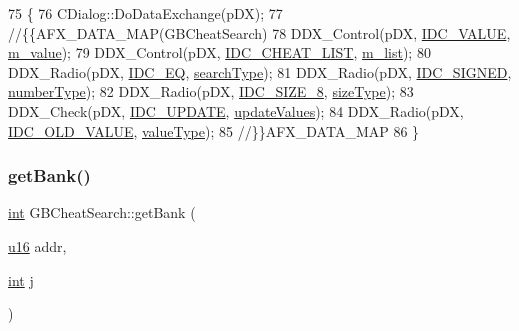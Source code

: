 \begin{DoxyCode}
75 \{
76   CDialog::DoDataExchange(pDX);
77   \textcolor{comment}{//\{\{AFX\_DATA\_MAP(GBCheatSearch)}
78   DDX\_Control(pDX, \mbox{\hyperlink{resource_8h_aa862eefddc803e8e65c3253b8029314f}{IDC\_VALUE}}, \mbox{\hyperlink{class_g_b_cheat_search_a95286f2e1e0637f2879a2dbe729d34c1}{m\_value}});
79   DDX\_Control(pDX, \mbox{\hyperlink{resource_8h_a9e21f8b69374571cc4aa6ab5a8ce0b9b}{IDC\_CHEAT\_LIST}}, \mbox{\hyperlink{class_g_b_cheat_search_a4385c178810aafb751e2bbc80a1a67c3}{m\_list}});
80   DDX\_Radio(pDX, \mbox{\hyperlink{resource_8h_a9ae6b6a030401ea977f3047c9080ba6c}{IDC\_EQ}}, \mbox{\hyperlink{class_g_b_cheat_search_a35d0a28509b050fcb3608d6f9777bda7}{searchType}});
81   DDX\_Radio(pDX, \mbox{\hyperlink{resource_8h_ae13e01a62e7c40be0e3a93d98d2cd1d3}{IDC\_SIGNED}}, \mbox{\hyperlink{class_g_b_cheat_search_aff51de1046c650805a8b749aa8df9cad}{numberType}});
82   DDX\_Radio(pDX, \mbox{\hyperlink{resource_8h_aabec7e8ec4648288db9ff8c10fdf3bb7}{IDC\_SIZE\_8}}, \mbox{\hyperlink{class_g_b_cheat_search_ad6db93445aa94c36d4d5275204e7ecb0}{sizeType}});
83   DDX\_Check(pDX, \mbox{\hyperlink{resource_8h_a2a7a453cb162c04233ad8c656a8fd6a9}{IDC\_UPDATE}}, \mbox{\hyperlink{class_g_b_cheat_search_aa300097df0223fda71edea99324e9cb6}{updateValues}});
84   DDX\_Radio(pDX, \mbox{\hyperlink{resource_8h_a82e2e020fb1d5c999e3ffdd35e74dec7}{IDC\_OLD\_VALUE}}, \mbox{\hyperlink{class_g_b_cheat_search_a86a4834163ee6a13a5bb8531a7c67c1d}{valueType}});
85   \textcolor{comment}{//\}\}AFX\_DATA\_MAP}
86 \}
\end{DoxyCode}
\mbox{\label{class_g_b_cheat_search_aa5ca7951ce9dcc691eff7abb51cde184}} 
\subsubsection{\texorpdfstring{get\+Bank()}{getBank()}}
{\footnotesize\ttfamily \mbox{\hyperlink{_util_8cpp_a0ef32aa8672df19503a49fab2d0c8071}{int}} G\+B\+Cheat\+Search\+::get\+Bank (\begin{DoxyParamCaption}\item[{\mbox{\hyperlink{_system_8h_a9e6c91d77e24643b888dbd1a1a590054}{u16}}}]{addr,  }\item[{\mbox{\hyperlink{_util_8cpp_a0ef32aa8672df19503a49fab2d0c8071}{int}}}]{j }\end{DoxyParamCaption})}



